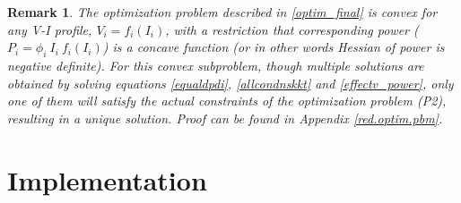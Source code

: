 \documentclass[twocolumn]{autart}
\newtheorem{remark}{Remark}
\begin{document}
\begin{remark}
The optimization problem described in \eqref{optim_final} is convex for any V-I profile, $V_i = f_i(I_i)$, with a restriction that corresponding power ($P_i = \phi_i \ I_i \ f_i(I_i)$) is a concave function (or in other words Hessian of power is negative definite). For this convex subproblem, though multiple solutions are obtained by solving equations \eqref{equaldpdi}, \eqref{allcondnskkt} and \eqref{effectv_power}, only one of them will satisfy the actual constraints of the optimization problem (P2), resulting in a unique solution. Proof can be found in Appendix \ref{red.optim.pbm}.
\end{remark}

\section{Implementation}
\end{document}

